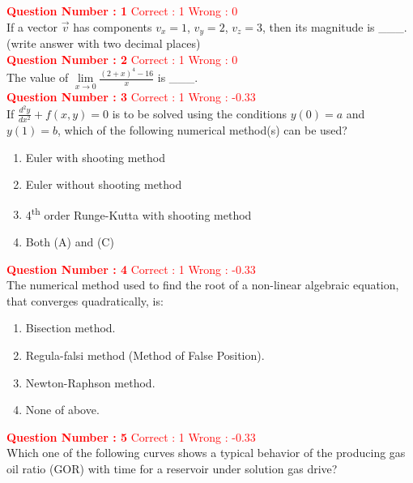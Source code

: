 \documentclass[12pt]{article}
\begin{document}
{
\Large

\textbf{\textcolor{red}{Question Number : 1}} \hfill \textcolor{red}{Correct : 1  Wrong : 0} \\[1ex]
If a vector $\vec{v}$ has components $v_x = 1$, $v_y = 2$, $v_z = 3$, then its magnitude is \_\_\_.\\
(write answer with two decimal places)\\[3ex]


\textbf{\textcolor{red}{Question Number : 2}} \hfill \textcolor{red}{Correct : 1  Wrong : 0} \\[1ex]
The value of 
{\LARGE$
\lim\limits_{x \to 0} \frac{(2 + x)^4 - 16}{x}
$ }
is \_\_\_.\\[3ex]


\textbf{\textcolor{red}{Question Number : 3}} \hfill \textcolor{red}{Correct : 1  Wrong : -0.33} \\[1ex]
If 
{\LARGE$
\frac{d^2 y}{dx^2} + f(x, y) = 0
$}
is to be solved using the conditions $y(0) = a$ and $y(1) = b$, which of the following numerical method(s) can be used?

\begin{enumerate}[label=(\Alph*)]
    \item Euler with shooting method
    \item Euler without shooting method
    \item 4\textsuperscript{th} order Runge-Kutta with shooting method
    \item Both (A) and (C)
\end{enumerate}
\vspace{2ex}


\textbf{\textcolor{red}{Question Number : 4}} \hfill \textcolor{red}{Correct : 1  Wrong : -0.33} \\[1ex]
The numerical method used to find the root of a non-linear algebraic equation, that converges quadratically, is:

\begin{enumerate}[label=(\Alph*)]
    \item Bisection method.
    \item Regula-falsi method (Method of False Position).
    \item Newton-Raphson method.
    \item None of above.
\end{enumerate}

\newpage



\textbf{\textcolor{red}{Question Number : 5}} \hfill \textcolor{red}{Correct : 1  Wrong : -0.33} \\[1ex]
Which one of the following curves shows a typical behavior of the producing gas oil ratio (GOR) with time for a reservoir under solution gas drive?

}
\end{document}
